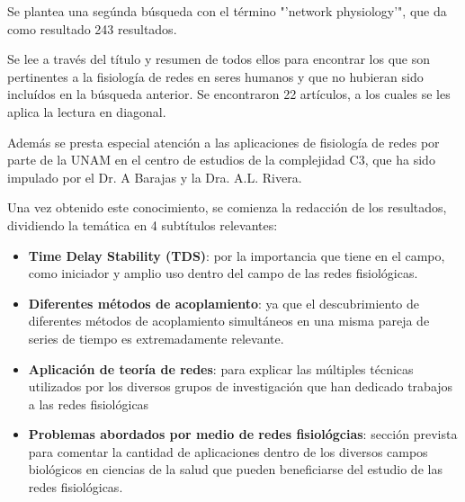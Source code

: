 \documentclass[twoside,twocolumn]{article}
\begin{document}
Se plantea una segúnda búsqueda con el término "'network physiology'", que da como resultado 243 resultados.

Se lee a través del título y resumen de todos ellos para  encontrar los que son pertinentes a la fisiología de redes en seres humanos y que no hubieran sido incluídos en la búsqueda anterior. Se encontraron 22 artículos, a los cuales se les aplica la lectura en diagonal.

Además se presta especial atención a las aplicaciones de fisiología de redes por parte de la UNAM en el centro de estudios de la complejidad C3, que ha sido impulado por el Dr. A Barajas y la Dra. A.L. Rivera.

Una vez obtenido este conocimiento, se comienza la redacción de los resultados, dividiendo la temática en 4 subtítulos relevantes:
\begin{itemize}
  \item \textbf{Time Delay Stability (TDS)}: por la importancia que tiene en el campo, como iniciador y amplio uso dentro del campo de las redes fisiológicas.
  \item \textbf{Diferentes métodos de acoplamiento}: ya que el descubrimiento de diferentes métodos de acoplamiento simultáneos en una misma pareja de series de tiempo es extremadamente relevante.
  \item \textbf{Aplicación de teoría de redes}: para explicar las múltiples técnicas utilizados por los diversos grupos de investigación que han dedicado trabajos a las redes fisiológicas
  \item \textbf{Problemas abordados por medio de redes fisiológcias}: sección prevista para comentar la cantidad de aplicaciones dentro de los diversos campos biológicos en ciencias de la salud que pueden beneficiarse del estudio de las redes fisiológicas.
\end{itemize}

\end{document}
